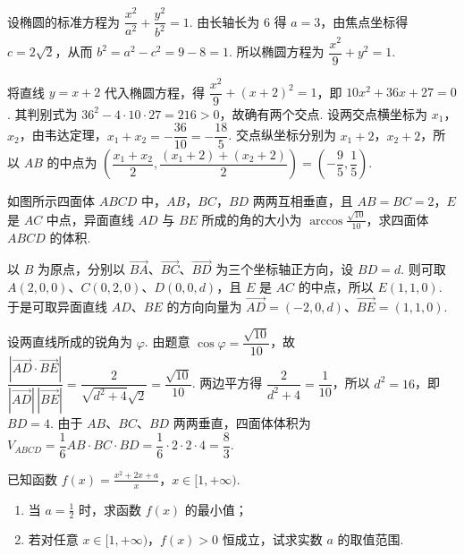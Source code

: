 \begin{solution}
设椭圆的标准方程为 \(\dfrac{x^2}{a^2}+\dfrac{y^2}{b^2}=1\). 由长轴长为 \(6\) 得 \(a=3\)，由焦点坐标得 \(c=2\sqrt{2}\)，从而 \(b^2=a^2-c^2=9-8=1\). 所以椭圆方程为 \(\dfrac{x^2}{9}+y^2=1\).

将直线 \(y=x+2\) 代入椭圆方程，得 \(\dfrac{x^2}{9}+(x+2)^2=1\)，即 \(10x^2+36x+27=0\). 其判别式为 \(36^2-4\cdot10\cdot27=216>0\)，故确有两个交点. 设两交点横坐标为 \(x_1\)，\(x_2\)，由韦达定理，\(x_1+x_2=-\dfrac{36}{10}=-\dfrac{18}{5}\). 交点纵坐标分别为 \(x_1+2\)，\(x_2+2\)，所以 \(AB\) 的中点为
\(\left(\dfrac{x_1+x_2}{2},\dfrac{(x_1+2)+(x_2+2)}{2}\right)=\left(-\dfrac{9}{5},\dfrac{1}{5}\right)\).
\end{solution}

\begin{problem}
如图所示四面体 \(ABCD\) 中，\(AB\)，\(BC\)，\(BD\) 两两互相垂直，且 \(AB = BC = 2\)，\(E\) 是 \(AC\) 中点，异面直线 \(AD\) 与 \(BE\) 所成的角的大小为 \(\arccos \frac{\sqrt{10}}{10}\)，求四面体 \(ABCD\) 的体积.

\end{problem}

\begin{solution}
以 \(B\) 为原点，分别以 \(\overrightarrow{BA}\)、\(\overrightarrow{BC}\)、\(\overrightarrow{BD}\) 为三个坐标轴正方向，设 \(BD=d\). 则可取 \(A(2,0,0)\)、\(C(0,2,0)\)、\(D(0,0,d)\)，且 \(E\) 是 \(AC\) 的中点，所以 \(E(1,1,0)\). 于是可取异面直线 \(AD\)、\(BE\) 的方向向量为 \(\overrightarrow{AD}=(-2,0,d)\)、\(\overrightarrow{BE}=(1,1,0)\).

设两直线所成的锐角为 \(\varphi\). 由题意 \(\cos\varphi=\dfrac{\sqrt{10}}{10}\)，故
\(\dfrac{|\overrightarrow{AD}\cdot\overrightarrow{BE}|}{|\overrightarrow{AD}|\,|\overrightarrow{BE}|}=\dfrac{2}{\sqrt{d^2+4}\sqrt{2}}=\dfrac{\sqrt{10}}{10}\).
两边平方得 \(\dfrac{2}{d^2+4}=\dfrac{1}{10}\)，所以 \(d^2=16\)，即 \(BD=4\). 由于 \(AB\)、\(BC\)、\(BD\) 两两垂直，四面体体积为
\(V_{ABCD}=\dfrac{1}{6}AB\cdot BC\cdot BD=\dfrac{1}{6}\cdot2\cdot2\cdot4=\dfrac{8}{3}\).
\end{solution}

\begin{problem}
已知函数 \(f(x) = \frac{x^2 + 2x + a}{x}\)，\(x \in [1, +\infty)\).
\begin{enumerate}
\item 当 \(a = \frac{1}{2}\) 时，求函数 \(f(x)\) 的最小值；
\item 若对任意 \(x \in [1, +\infty)\)，\(f(x) > 0\) 恒成立，试求实数 \(a\) 的取值范围.
\end{enumerate}
\end{problem}

